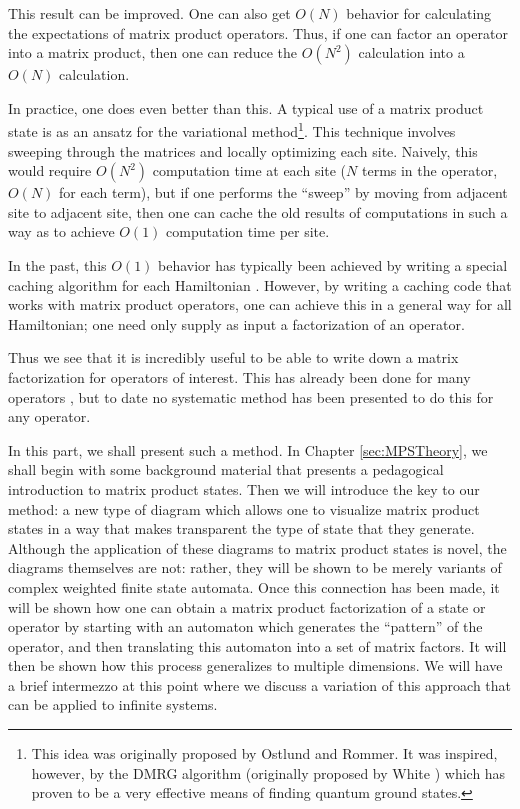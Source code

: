 \documentclass[12pt]{amsbook}
\theoremstyle{plain}
\theoremstyle{definition}
\theoremstyle{remark}
\begin{document}
This result can be improved.  One can also get $O(N)$ behavior for calculating the expectations of matrix product operators.  Thus, if one can factor an operator into a matrix product, then one can reduce the $O(N^2)$ calculation into a $O(N)$ calculation.

In practice, one does even better than this.  A typical use of a matrix product state is as an ansatz for the variational method\footnote{This idea was originally proposed by Ostlund and Rommer\cite{Ostlund:1995uq}.  It was inspired, however, by the DMRG algorithm (originally proposed by White \cite{White:1992ys}) which has proven to be a very effective means of finding quantum ground states.}.  This technique involves sweeping through the matrices and locally optimizing each site.  Naively, this would require $O(N^2)$ computation time at each site ($N$ terms in the operator, $O(N)$ for each term), but if one performs the ``sweep'' by moving from adjacent site to adjacent site, then one can cache the old results of computations in such a way as to achieve $O(1)$ computation time per site.

In the past, this $O(1)$ behavior has typically been achieved by writing a special caching algorithm for each Hamiltonian \cite{cond-mat/0404706}.  However, by writing a caching code that works with matrix product operators, one can achieve this in a general way for all Hamiltonian;  one need only supply as input a factorization of an operator.

Thus we see that it is incredibly useful to be able to write down a matrix factorization for operators of interest.  This has already been done for many operators \cite{cond-mat/0701428}, but to date no systematic method has been presented to do this for any operator.

In this part, we shall present such a method.  In Chapter \ref{sec:MPSTheory}, we shall begin with some background material that presents a pedagogical introduction to matrix product states.  Then we will introduce the key to our method:  a new type of diagram which allows one to visualize matrix product states in a way that makes transparent the type of state that they generate.  Although the application of these diagrams to matrix product states is novel, the diagrams themselves are not:  rather, they will be shown to be merely variants of complex weighted finite state automata.  Once this connection has been made, it will be shown how one can obtain a matrix product factorization of a state or operator by starting with an automaton which generates the ``pattern'' of the operator, and then translating this automaton into a set of matrix factors.  It will then be shown how this process generalizes to multiple dimensions.  We will have a brief intermezzo at this point where we discuss a variation of this approach that can be applied to infinite systems.
\end{document}
